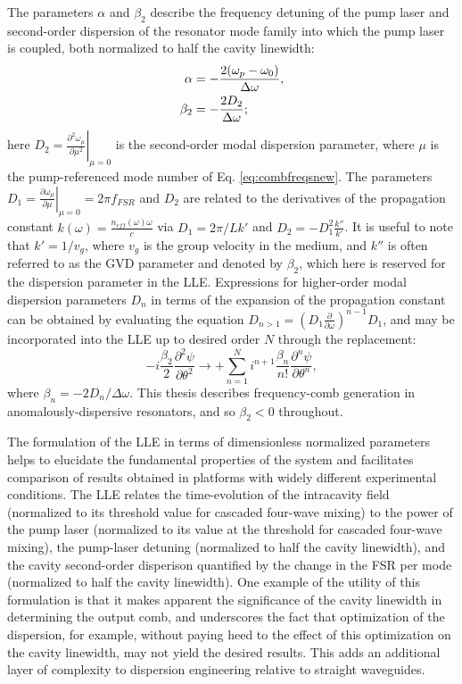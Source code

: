 The parameters $\alpha$ and $\beta_2$ describe the frequency detuning of the pump laser and second-order dispersion of the resonator mode family into which the pump laser is coupled, both normalized to half the cavity linewidth: 
\begin{align}
\alpha&=-\frac{2(\omega_{p}-\omega_0)}{\Delta\omega},\\
\beta_2&=-\frac{2 D_2}{\Delta\omega};
\end{align} here $D_2=\left.\frac{\partial^2\omega_\mu}{\partial \mu^2}\right|_{\mu=0}$ is the second-order modal dispersion parameter, where $\mu$ is the pump-referenced mode number of Eq. \ref{eq:combfreqsnew}. The parameters $D_1=\left.\frac{\partial\omega_\mu}{\partial\mu}\right|_{\mu=0}=2\pi f_{FSR}$ and $D_2$ are related to the derivatives of the propagation constant $k(\omega)=\frac{n_{eff}(\omega)\omega}{c}$ via $D_1=2\pi/Lk'$ and $D_2=-D_1^2\frac{k''}{k'}$. It is useful to note that $k'=1/v_g$, where $v_g$ is the group velocity in the medium, and $k''$ is often referred to as the GVD parameter and denoted by $\beta_2$, which here is reserved for the dispersion parameter in the LLE. Expressions for higher-order modal dispersion parameters $D_n$ in terms of the expansion of the propagation constant can be obtained by evaluating the equation $D_{n>1}=(D_1\frac{\partial}{\partial \omega})^{n-1} D_1$, and may be incorporated into the LLE up to desired order $N$ through the replacement:
\begin{equation}
-i\frac{\beta_2}{2}\frac{\partial^2\psi}{\partial\theta^2}\rightarrow +\sum_{n=1}^N i^{n+1} \frac{\beta_n}{n!}\frac{\partial^n\psi}{\partial\theta^n},
\end{equation}
where $\beta_n=-2D_n/\Delta\omega$. This thesis describes frequency-comb generation in anomalously-dispersive resonators, and so $\beta_2<0$ throughout.

The formulation of the LLE in terms of dimensionless normalized parameters helps to elucidate the fundamental properties of the system and facilitates comparison of results obtained in platforms with widely different experimental conditions. The LLE relates the time-evolution of the intracavity field (normalized to its threshold value for cascaded four-wave mixing) to the power of the pump laser (normalized to its value at the threshold for cascaded four-wave mixing), the pump-laser detuning (normalized to half the cavity linewidth), and the cavity second-order disperison quantified by the change in the FSR per mode (normalized to half the cavity linewidth). One example of the utility of this formulation is that it makes apparent the significance of the cavity linewidth in determining the output comb, and underscores the fact that optimization of the dispersion, for example, without paying heed to the effect of this optimization on the cavity linewidth, may not yield the desired results. This adds an additional layer of complexity to dispersion engineering relative to straight waveguides.

